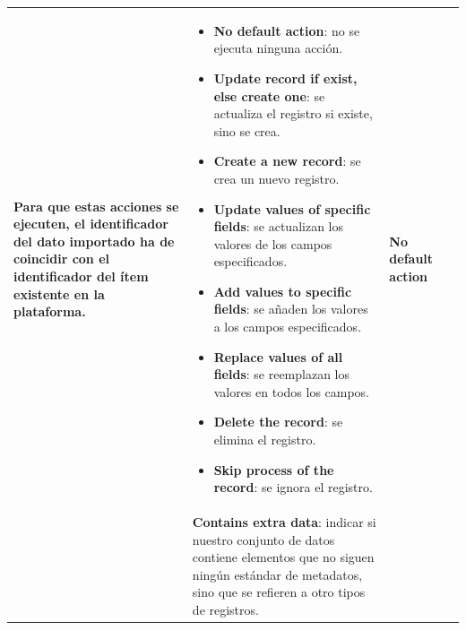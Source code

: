 \documentclass[
]{article}
\providecommand{\tightlist}{%
  \setlength{\itemsep}{0pt}\setlength{\parskip}{0pt}}
\begin{document}
\begin{longtable}[]{@{}llll@{}}
\begin{minipage}[t]{0.22\columnwidth}
\textbf{Para que estas acciones se ejecuten, el identificador del dato
importado ha de coincidir con el identificador del ítem existente en la
plataforma.}\strut
\end{minipage} & \begin{minipage}[t]{0.22\columnwidth}\raggedright
\begin{itemize}
\tightlist
\item
  \textbf{No default action}: no se ejecuta ninguna acción.
\item
  \textbf{Update record if exist, else create one}: se actualiza el
  registro si existe, sino se crea.
\item
  \textbf{Create a new record}: se crea un nuevo registro.
\item
  \textbf{Update values of specific fields}: se actualizan los valores
  de los campos especificados.
\item
  \textbf{Add values to specific fields}: se añaden los valores a los
  campos especificados.
\item
  \textbf{Replace values of all fields}: se reemplazan los valores en
  todos los campos.
\item
  \textbf{Delete the record}: se elimina el registro.
\item
  \textbf{Skip process of the record}: se ignora el registro.
\end{itemize}\strut
\end{minipage} & \begin{minipage}[t]{0.22\columnwidth}\raggedright
\textbf{No default action}\strut
\end{minipage}\tabularnewline
\begin{minipage}[t]{0.22\columnwidth}\raggedright
\strut
\end{minipage} & \begin{minipage}[t]{0.22\columnwidth}\raggedright
\textbf{Contains extra data}: indicar si nuestro conjunto de datos
contiene elementos que no siguen ningún estándar de metadatos, sino que
se refieren a otro tipos de registros.


\end{minipage}
\end{longtable}
\end{document}
